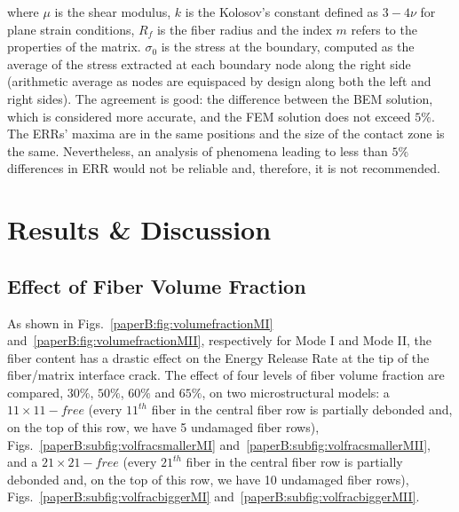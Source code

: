 where $\mu$ is the shear modulus, $k$ is the Kolosov's constant defined as $3-4\nu$ for plane strain conditions, $R_{f}$ is the fiber radius and the index $m$ refers to the properties of the matrix. $\sigma_{0}$ is the stress at the boundary, computed as the average of the stress extracted at each boundary node along the right side (arithmetic average as nodes are equispaced by design along both the left and right sides). The agreement is good: the difference between the BEM solution, which is considered more accurate, and the FEM solution does not exceed $5\%$. The ERRs' maxima are in the same positions and the size of the contact zone is the same.  Nevertheless, an analysis of phenomena leading to less than $5\%$ differences in ERR would not be reliable and, therefore, it is not recommended.


\section{Results \& Discussion}

\subsection{Effect of Fiber Volume Fraction}\label{paperB:subsec:volfrac}

As shown in Figs.~\ref{paperB:fig:volumefractionMI} and~\ref{paperB:fig:volumefractionMII}, respectively for Mode I and Mode II, the fiber content has a drastic effect on the Energy Release Rate at the tip of the fiber/matrix interface crack. The effect of four levels of fiber volume fraction are compared, $30\%$, $50\%$, $60\%$ and $65\%$, on two microstructural models: a $11\times 11-free$ (every $11^{th}$ fiber in the central fiber row is partially debonded and, on the top of this row, we have 5 undamaged fiber rows), Figs.~\ref{paperB:subfig:volfracsmallerMI} and~\ref{paperB:subfig:volfracsmallerMII}, and a $21\times 21-free$ (every $21^{th}$ fiber in the central fiber row is partially debonded and, on the top of this row, we have 10 undamaged fiber rows), Figs.~\ref{paperB:subfig:volfracbiggerMI} and~\ref{paperB:subfig:volfracbiggerMII}.

